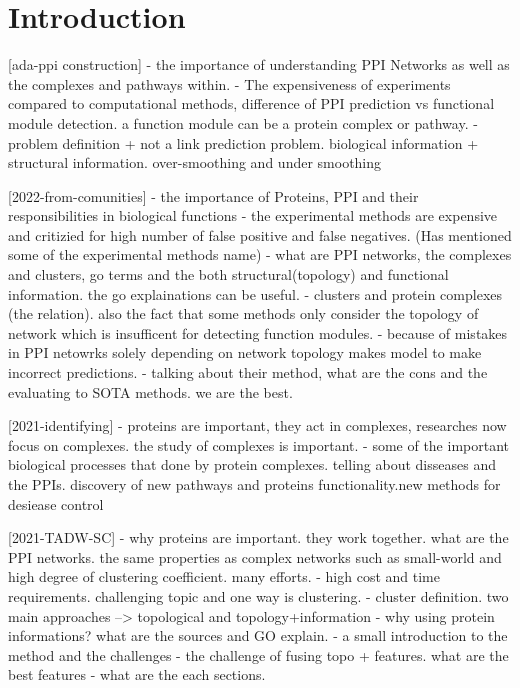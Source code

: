 \section{Introduction}

\iffalse

[ada-ppi construction]
- the importance of understanding PPI Networks as well as the complexes and pathways within.
- The expensiveness of experiments compared to computational methods, difference of PPI prediction vs functional module detection. a function module can be a protein complex or  pathway.
- problem definition + not a link prediction problem. biological information + structural information. over-smoothing and under smoothing

[2022-from-comunities]
- the importance of Proteins, PPI and their responsibilities in biological functions
- the experimental methods are expensive and critizied for high number of false positive and false negatives. (Has mentioned some of the experimental methods name)
- what are PPI networks, the complexes and clusters, go terms and the both structural(topology) and functional information. the go explainations can be useful.
- clusters and protein complexes (the relation). also the fact that some methods only consider the topology of network which is insufficent for detecting function modules.
- because of mistakes in PPI netowrks solely depending on network topology makes model to make incorrect predictions.
- talking about their method, what are the cons and the evaluating to SOTA methods. we are the best.

[2021-identifying]
- proteins are important, they act in complexes, researches now focus on complexes. the study of complexes is important.
- some of the important biological processes that done by protein complexes. telling about disseases and the PPIs. discovery of new pathways and proteins functionality.new methods for desiease control

[2021-TADW-SC]
- why proteins are important. they work together. what are the PPI networks. the same properties as complex networks such as small-world and high degree of clustering coefficient. many efforts.
- high cost and time requirements. challenging topic and one way is clustering.
- cluster definition. two main approaches --> topological and topology+information
- why using protein informations? what are the sources and GO explain.
- a small introduction to the method and the challenges
- the challenge of fusing topo + features. what are the best features 
- what are the each sections.


